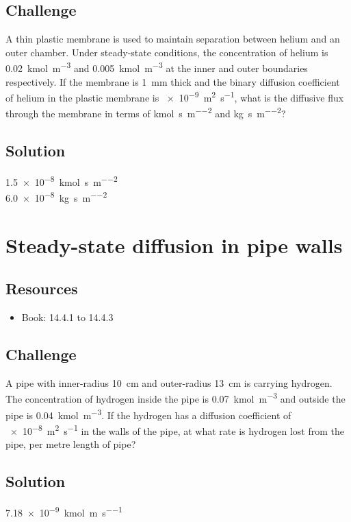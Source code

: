 \subsection*{Challenge}
A thin plastic membrane is used to maintain separation between helium and an outer chamber. Under steady-state conditions, the concentration of helium is \SI{0.02}{\kmol\per\cubic\meter} and \SI{0.005}{\kmol\per\cubic\meter} at the inner and outer boundaries respectively. If the membrane is \SI{1}{\mm} thick and the binary diffusion coefficient of helium in the plastic membrane is \SI{e-9}{\square\meter\per\second}, what is the diffusive flux through the membrane in terms of \si{\kmol\per\second\per\square\meter} and \si{\kg\per\second\per\square\meter}?

\subsection*{Solution}
\SI{1.5e-8}{\kmol\per\second\per\square\meter}\\
\SI{6.0e-8}{\kg\per\second\per\square\meter}




\newpage
\section{Steady-state diffusion in pipe walls}

\subsection*{Resources}
\begin{itemize}
    \item Book: 14.4.1 to 14.4.3
\end{itemize}

\subsection*{Challenge}
A pipe with inner-radius \SI{10}{\cm} and outer-radius \SI{13}{\cm} is carrying hydrogen. The concentration of hydrogen inside the pipe is \SI{0.07}{\kmol\per\cubic\meter} and outside the pipe is \SI{0.04}{\kmol\per\cubic\meter}. If the hydrogen has a diffusion coefficient of \SI{e-8}{\square\meter\per\second} in the walls of the pipe, at what rate is hydrogen lost from the pipe, per metre length of pipe?

\subsection*{Solution}
\SI{7.18e-9}{\kmol\per\meter\per\second}




